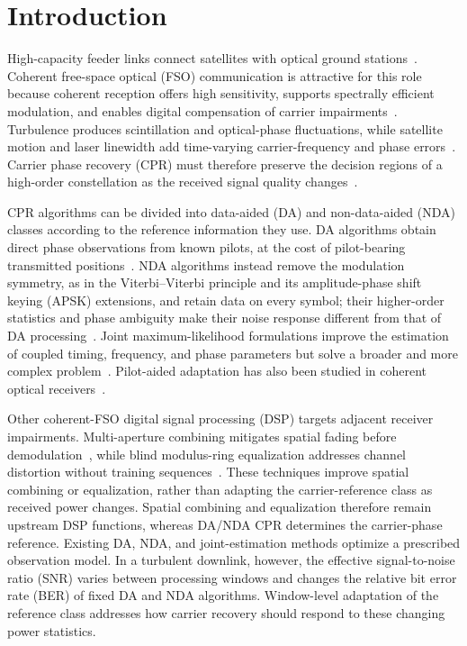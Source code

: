 \section{Introduction}

High-capacity feeder links connect satellites with optical ground stations~\cite{horst2023tbit}. Coherent free-space optical (FSO) communication is attractive for this role because coherent reception offers high sensitivity, supports spectrally efficient modulation, and enables digital compensation of carrier impairments~\cite{valjus2025dsp,paillier2020spaceground,guiomar2022coherent}. Turbulence produces scintillation and optical-phase fluctuations, while satellite motion and laser linewidth add time-varying carrier-frequency and phase errors~\cite{alhabash2001,paillier2020spaceground}. Carrier phase recovery (CPR) must therefore preserve the decision regions of a high-order constellation as the received signal quality changes~\cite{taylor2009phase}.

CPR algorithms can be divided into data-aided (DA) and non-data-aided (NDA) classes according to the reference information they use. DA algorithms obtain direct phase observations from known pilots, at the cost of pilot-bearing transmitted positions~\cite{gavert2022pilot,zhang2010decisionaided}. NDA algorithms instead remove the modulation symmetry, as in the Viterbi--Viterbi principle and its amplitude-phase shift keying (APSK) extensions, and retain data on every symbol; their higher-order statistics and phase ambiguity make their noise response different from that of DA processing~\cite{viterbi1983,du2025nda}. Joint maximum-likelihood formulations improve the estimation of coupled timing, frequency, and phase parameters but solve a broader and more complex problem~\cite{wang2022jointml,du2021jointml,liu2025tdml}. Pilot-aided adaptation has also been studied in coherent optical receivers~\cite{wang2025pilotmlsd}.

Other coherent-FSO digital signal processing (DSP) targets adjacent receiver impairments. Multi-aperture combining mitigates spatial fading before demodulation~\cite{liu2023multiaperture}, while blind modulus-ring equalization addresses channel distortion without training sequences~\cite{qin2026blindvae}. These techniques improve spatial combining or equalization, rather than adapting the carrier-reference class as received power changes. Spatial combining and equalization therefore remain upstream DSP functions, whereas DA/NDA CPR determines the carrier-phase reference. Existing DA, NDA, and joint-estimation methods optimize a prescribed observation model. In a turbulent downlink, however, the effective signal-to-noise ratio (SNR) varies between processing windows and changes the relative bit error rate (BER) of fixed DA and NDA algorithms. Window-level adaptation of the reference class addresses how carrier recovery should respond to these changing power statistics.

